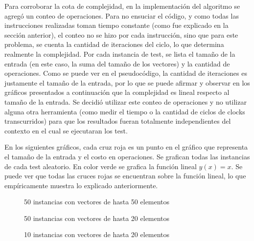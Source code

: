 \documentclass[10pt, a4paper,english,spanish]{article}
\begin{document}
\indent Para corroborar la cota de complejidad, en la implementación del algoritmo se agregó un conteo de operaciones.
Para no ensuciar el código, y como todas las instrucciones realizadas toman tiempo constante
(como fue explicado en la sección anterior), el conteo no se hizo por cada instrucción, sino
que para este problema, se cuenta la cantidad de iteraciones del ciclo, lo que determina
realmente la complejidad. Por cada instancia de test, se lista el tamaño de la entrada (en este caso, la suma del tamaño
de los vectores) y la cantidad de operaciones. Como se puede ver en el pseudocódigo, la cantidad
de iteraciones es justamente el tamaño de la entrada, por lo que se puede afirmar y observar en
los gráficos presentados a continuación que la complejidad es lineal respecto al tamaño de la entrada.
Se decidió utilizar este conteo de operaciones y no utilizar alguna otra herramienta (como medir el tiempo o la cantidad
de ciclos de clocks transcurridos) para que los resultados fueran totalmente independientes del contexto en el cual
se ejecutaran los test.
 
En los siguientes gráficos, cada cruz roja es un punto en el gráfico que representa el tamaño de la entrada y el costo en operaciones. 
Se grafican todas las instancias de cada test aleatorio. En color verde se grafica la función lineal $y(x)=x$. 
Se puede ver que todas las cruces rojas se encuentran sobre la función lineal, lo que empíricamente muestra lo explicado anteriormente.

 \begin{figure}[H]
     \begin{center}
       \caption{50 instancias con vectores de hasta 50 elementos}
       \label{gr4}
     \end{center}
   \end{figure}

 \begin{figure}[H]
     \begin{center}
       \caption{50 instancias con vectores de hasta 20 elementos}
       \label{gr4}
     \end{center}
   \end{figure}

 \begin{figure}[H]
     \begin{center}
       \caption{10 instancias con vectores de hasta 20 elementos}
       \label{gr4}
     \end{center}
   \end{figure}
\end{document}
